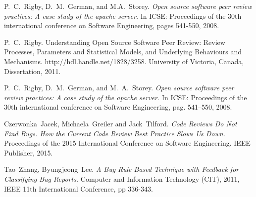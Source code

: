 \documentclass[10pt, conference]{IEEEtran}
\begin{document}
\begin{thebibliography}{1}
P.~C.~Rigby, D.~M.~German, and M.A.~Storey. \emph{Open
source software peer review practices: A case study of
the apache server.} In ICSE: Proceedings of the 30th
international conference on Software Engineering,
pages 541-550, 2008.

P.~C.~Rigby. Understanding Open Source Software Peer 
Review: Review Processes, Parameters and Statistical 
Models, and Underlying Behaviours and Mechanisms. 
http://hdl.handle.net/1828/3258. University of Victoria, 
Canada, Dissertation, 2011.

P.~C.~Rigby, D.~M.~German, and  M.~A.~Storey. \emph{Open
source software peer review practices: A case study of the apache server.} 
In ICSE: Proceedings of the 30th international conference on Software Engineering, 
pag. 541–550, 2008.

Czerwonka~Jacek, Michaela~Greiler and Jack~Tilford.
\emph{Code Reviews Do Not Find Bugs. How the Current
Code Review Best Practice Slows Us Down.}
Proceedings of the 2015 International Conference on
Software Engineering. IEEE Publisher, 2015.  

Tao~Zhang, Byungjeong~Lee. \emph{A Bug Rule Based Technique with Feedback for 
Classifying Bug Reports.} Computer and Information Technology (CIT), 2011, 
IEEE 11th International Conference, pp 336-343.

\end{thebibliography}




\end{document}
